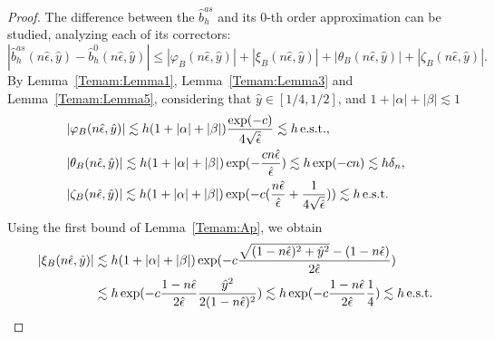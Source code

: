\documentclass{article}
\newcommand{\est}{\text{\,e.s.t.}\xspace}
\newcommand{\nep}{\ensuremath{n\epsilon}}
\newcommand{\hatb}{\ensuremath{\hat{b}}}
\newcommand{\haty}{\ensuremath{{\hat{y}}}}
\newcommand{\hatnep}{\ensuremath{n\hat{\epsilon}}}
\begin{document}
\begin{appendix}
\begin{proof}
The difference between the $\hatb_h^{as}$ and its $0$-th order approximation can be studied, analyzing each of its correctors:
\begin{equation}
\label{eq:bh_neps_correctors}    
    |\hatb_h^{as}(n\hat{\epsilon},\haty)-\hatb_h^0(n\hat{\epsilon},\haty)|\leq
    |\varphi_B(n\hat{\epsilon},\haty)| + |\xi_B(n\hat{\epsilon},\haty)| + |\theta_B(n\hat{\epsilon},\haty)| + |\zeta_B(n\hat{\epsilon},\haty)|.
\end{equation}
By Lemma~\ref{Temam:Lemma1}, Lemma~\ref{Temam:Lemma3}  and Lemma~\ref{Temam:Lemma5},  considering that $\haty\in[1/4,1/2]$, and $1+|\alpha|+|\beta|\lesssim 1$
\begin{equation}
\begin{aligned}
\label{eq:boundACD_3}
    &|\varphi_B(\hatnep,\haty)| \lesssim h(1+|\alpha|+|\beta|)\frac{\exp(-c)}{4\sqrt{\hat{\epsilon}}}
    \lesssim h\est,\\
    &|\theta_B(\hatnep,\haty)|\lesssim h(1+|\alpha|+|\beta|)\exp(-\frac{cn\hat{\epsilon}}{\hat{\epsilon}})\lesssim h\exp(-cn)
    \lesssim h\delta_n,
    \\
    &|\zeta_B(\hatnep,\haty)|\lesssim h(1+|\alpha|+|\beta|)\exp(-c(\frac{n\hat{\epsilon}}{\hat{\epsilon}}+\frac{1}{4\sqrt{\hat{\epsilon}}}))
    \lesssim h\est
\end{aligned}
\end{equation}
Using the first bound of Lemma~\ref{Temam:Ap}, we obtain
\begin{equation}
\label{eq:boundB_3}
\begin{aligned}
    |\xi_B(\hatnep,\haty)|&\lesssim h(1+|\alpha|+|\beta|)
    \exp(-c\frac{\sqrt{(1-\hatnep)^2+\haty^2}-(1-\hatnep)}{2\hat{\epsilon}})\\
    & \lesssim 
    h\exp(-c\frac{1-\hatnep}{2\hat{\epsilon}}\frac{\haty^2}{2(1-\hatnep)^2})
    \lesssim
    h\exp(-c\frac{1-\hatnep}{2\hat{\epsilon}}\frac{1}{4})
    \lesssim h\est
\end{aligned}
\end{equation}

\end{proof}
\end{appendix}
\end{document}
